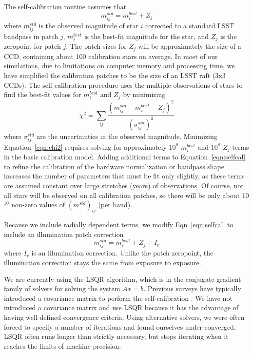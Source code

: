 \documentclass[12pt,preprint]{aastex}
\begin{document}

The self-calibration routine assumes that
\begin{equation} \label{eqn:selfcal}
m_{ij}^{std} = m_i^{best}+Z_j
\end{equation}
where $m_{ij}^{std}$ is the observed magnitude of star $i$ corrected
to a standard LSST bandpass in patch $j$, $m_i^{best}$ is the best-fit
magnitude for the star, and $Z_j$ is the zeropoint for patch $j$. The
patch sizes for $Z_j$ will be approximately the size of a CCD,
containing about 100 calibration stars on average. In most of our
simulations, due to limitations on computer memory and processing
time, we have simplified the calibration patches to be the size of an
LSST raft (3x3 CCDs). The self-calibration procedure uses the multiple
observations of stars to find the best-fit values for $m_i^{best}$ and
$Z_j$ by minimizing
\begin{equation} \label{eqn:chi2}
\chi^2 = \sum_{ij} \frac{(m^{std}_{ij}-m_{i}^{best}-Z_j)^2}{(\sigma_{ij}^{std})^2}
\end{equation}  
where $\sigma_{ij}^{std}$ are the uncertainties in the observed
magnitude.  Minimizing Equation~\ref{eqn:chi2} requires solving for
approximately $10^8$ $m_{i}^{best}$ and $10^8$ $Z_j$ terms in the
basic calibration model. Adding additional terms to
Equation~\ref{eqn:selfcal} to refine the calibration of the hardware
normalization or bandpass shape increases the number of parameters
that must be fit only slightly, as these terms are assumed constant
over large stretches (years) of observations. Of course, not all stars
will be observed on all calibration patches, so there will be only
about 10$^{10}$ non-zero values of $(m^{std})_{ij}$ (per band).

Because we include radially dependent terms, we modify Eqn~\ref{eqn:selfcal} to include an illumination patch correction
\begin{equation}
m_{ij}^{std} = m_i^{best}+Z_j+I_r
\end{equation}
where $I_r$ is an illumination correction.  Unlike the patch zeropoint, the illumination correction stays the same from exposure to exposure.  

We are currently using the LSQR algorithm, which is in the conjugate gradient
family of solvers for solving the system $Ax=b$.  Previous surveys
have typically introduced a covariance matrix to perform the
self-calibration \citep{pad08,Schaf12}.  We have not introduced a
covariance matrix and use LSQR because it has the advantage of having
well-defined convergence criteria.  Using alternative solvers, we were
often forced to specify a number of iterations and found ourselves
under-converged.  LSQR often runs longer than strictly necessary, but
stops iterating when it reaches the limits of machine precision.
\end{document}
